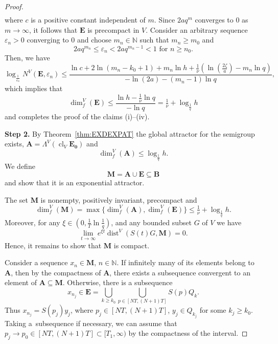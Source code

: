 \documentclass[10pt,a4paper]{amsart}
\newcommand{\N}{\mathbb{N}}
\newcommand{\cl}{\operatorname{cl}}
\newcommand{\dimf}{\operatorname{dim}_{f}}
\newcommand{\dist}{\operatorname{dist}}
\newcommand{\eps}{\varepsilon}
\renewcommand{\geq}{\geqslant}
\renewcommand{\leq}{\leqslant}
\begin{document}
\begin{proof}
\begin{equation*}
\begin{split}
\end{split}
\end{equation*}
where $c$ is a positive constant independent of $m$.
Since $2aq^m$ converges to $0$ as $m\to\infty$, it follows that $\mathbf{E}$
is precompact in $V$. Consider an arbitrary sequence $\eps_n>0$ converging to $0$ and choose
$m_n\in\N$ such that $m_n\geq m_0$ and
$$2aq^{m_n}\leq \eps_n<2aq^{m_n-1}<1\text{ for }n\geq n_0.$$
Then, we have
$$\log_{\frac{1}{\eps_n}}N^{V}(\mathbf{E},\eps_n)\leq\frac{\ln{c}+2\ln(m_n-k_0+1)+m_n\ln{h}+\frac{1}{\nu}\left(\ln(\frac{2\zeta}{a})-m_n\ln{q}\right)}{-\ln(2a)-(m_n-1)\ln{q}},$$
which implies that
$$\dimf^{V}(\mathbf{E})\leq\frac{\ln{h}-\tfrac{1}{\nu}\ln{q}}{-\ln{q}}=\tfrac{1}{\nu}+\log_{\frac{1}{q}}h$$
and completes the proof of the claims (i)--(iv).

\textbf{Step 2.}
By Theorem~\ref{thm:EXDEXPAT} the global attractor for the semigroup exists, $\mathbf{A}=\Lambda^{V}(\cl_{V}\mathbf{E_0})$  and
\begin{equation*}
\dimf^{V}(\mathbf{A})\leq\log_{\frac{1}{q}}h.
\end{equation*}
We define
$$\mathbf{M}=\mathbf{A}\cup\mathbf{E}\subseteq\mathbf{B}$$
and show that it is an exponential attractor. 

The set $\mathbf{M}$ is nonempty, positively invariant, precompact and
$$\dimf^{V}(\mathbf{M})=\max\{\dimf^{V}(\mathbf{A}),\dimf^{V}(\mathbf{E})\}\leq\tfrac{1}{\nu}+\log_{\frac{1}{q}}h.$$
Moreover,  for any $\xi\in(0,\frac{1}{T}\ln{\frac{1}{q}})$, and
any bounded subset $G$ of $V$ we have
$$\lim_{t\to\infty}e^{\xi t}\dist^{V}(S(t)G,\mathbf{M})=0.$$
Hence, it remains to show that $\mathbf{M}$ is compact.

Consider a sequence $x_n\in\mathbf{M}$, $n\in\N$. If infinitely many of its elements belong
to $\mathbf{A}$, then by the compactness of $\mathbf{A}$, there exists a subsequence convergent
to an element of $\mathbf{A}\subseteq\mathbf{M}$. Otherwise,  there is a subsequence
$$x_{n_j}\in\mathbf{E}=\bigcup_{k\geq k_0}\bigcup_{p\in[NT,(N+1)T]}S(p)Q_k.$$
Thus $x_{n_j}=S(p_j)y_j$, where $p_{j}\in[NT,(N+1)T]$, $y_j\in Q_{k_j}$ for some $k_j\geq k_0$.
Taking a~subsequence if necessary, we can assume that $p_j\to p_0\in[NT,(N+1)T]\subset[T_1,\infty)$
by the compactness of the interval.


\end{proof}
\end{document}
